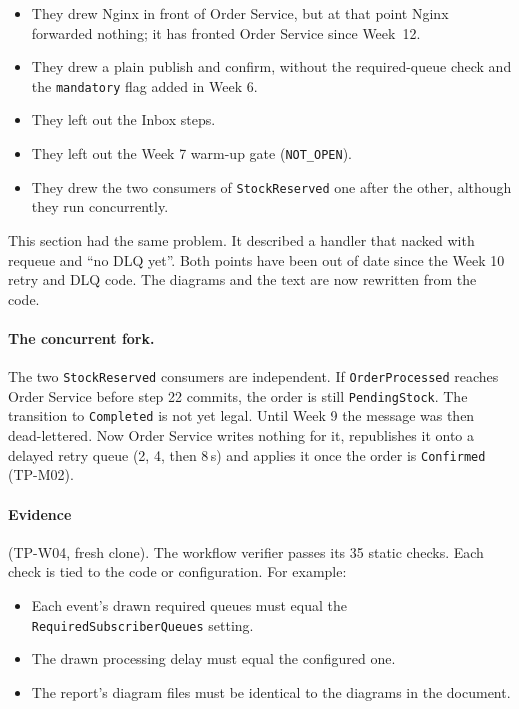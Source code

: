\documentclass[a4paper]{report}
\begin{document}
\begin{itemize}
  \item They drew Nginx in front of Order Service, but at that point Nginx forwarded nothing; it has fronted Order Service since Week~12.
  \item They drew a plain publish and confirm, without the required-queue
    check and the \texttt{mandatory} flag added in Week 6.
  \item They left out the Inbox steps.
  \item They left out the Week 7 warm-up gate (\texttt{NOT\_OPEN}).
  \item They drew the two consumers of \texttt{StockReserved} one after
    the other, although they run concurrently.
\end{itemize}

This section had the same problem. It described a handler that nacked with
requeue and ``no DLQ yet''. Both points have been out of date since the
Week 10 retry and DLQ code. The diagrams and the text are now rewritten from
the code.

\paragraph{The concurrent fork.} The two \texttt{StockReserved} consumers
are independent. If \texttt{OrderProcessed} reaches Order Service before
step 22 commits, the order is still \texttt{PendingStock}. The transition to
\texttt{Completed} is not yet legal. Until Week 9 the message was then
dead-lettered. Now Order Service writes nothing for it, republishes it onto a
delayed retry queue (2, 4, then 8\,s) and applies it once the order is
\texttt{Confirmed} (TP-M02).

\sloppy\paragraph{Evidence} (TP-W04, fresh clone).
The workflow verifier passes its 35 static checks. Each check
is tied to the code or configuration. For example:\par

\begin{itemize}
  \item Each event's drawn required queues must equal the
    \texttt{Required\allowbreak Subscriber\allowbreak Queues} setting.
  \item The drawn processing delay must equal the configured one.
  \item The report's diagram files must be identical to
    the diagrams in the document.
\end{itemize}
\end{document}
